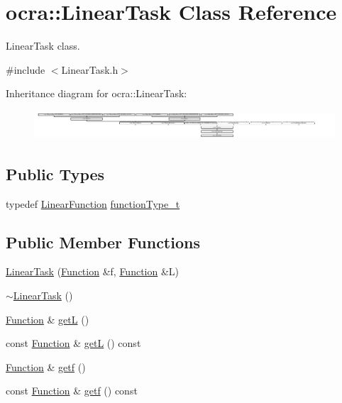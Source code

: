 \hypertarget{classocra_1_1LinearTask}{}\section{ocra\+:\+:Linear\+Task Class Reference}
\label{classocra_1_1LinearTask}


Linear\+Task class.  




{\ttfamily \#include $<$Linear\+Task.\+h$>$}

Inheritance diagram for ocra\+:\+:Linear\+Task\+:\begin{figure}[H]
\begin{center}
\leavevmode
\includegraphics[height=1.082126cm]{dd/d16/classocra_1_1LinearTask}
\end{center}
\end{figure}
\subsection*{Public Types}
\begin{DoxyCompactItemize}
\item 
typedef \hyperlink{classocra_1_1LinearFunction}{Linear\+Function} \hyperlink{classocra_1_1LinearTask_a72e12356b5513585a17c44d00d819289}{function\+Type\+\_\+t}
\end{DoxyCompactItemize}
\subsection*{Public Member Functions}
\begin{DoxyCompactItemize}
\item 
\hyperlink{classocra_1_1LinearTask_a6bbf60a2fde8bd52c79d3d26613f06a0}{Linear\+Task} (\hyperlink{classocra_1_1Function}{Function} \&f, \hyperlink{classocra_1_1Function}{Function} \&L)
\item 
\hyperlink{classocra_1_1LinearTask_ad443b3044cc66e3e68ea3f5062e37453}{$\sim$\+Linear\+Task} ()
\item 
\hyperlink{classocra_1_1Function}{Function} \& \hyperlink{classocra_1_1LinearTask_a84dc8ca9c882d3e1b864e78784814303}{getL} ()
\item 
const \hyperlink{classocra_1_1Function}{Function} \& \hyperlink{classocra_1_1LinearTask_acfca060d834f7141863d5f3d254d6c66}{getL} () const
\item 
\hyperlink{classocra_1_1Function}{Function} \& \hyperlink{classocra_1_1LinearTask_a64b0390b8b65bcd5a533c0b6774615ec}{getf} ()
\item 
const \hyperlink{classocra_1_1Function}{Function} \& \hyperlink{classocra_1_1LinearTask_a19be592ae8046225f171a54c01d40583}{getf} () const
\end{DoxyCompactItemize}
